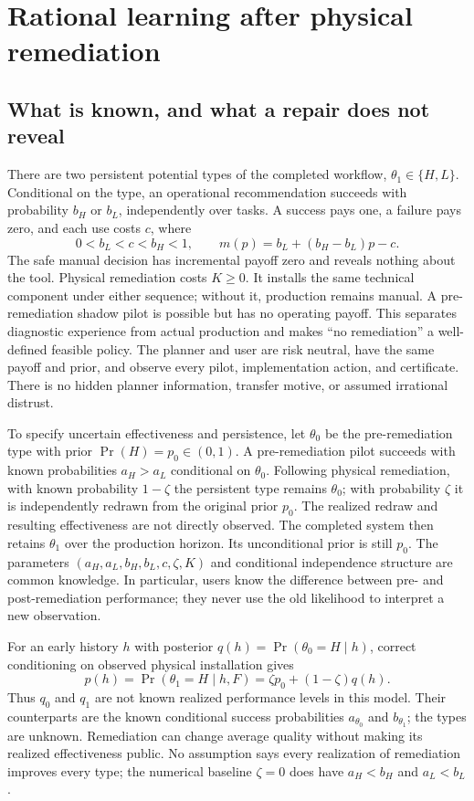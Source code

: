 \section{Rational learning after physical remediation}\label{sec:rational}
\subsection{What is known, and what a repair does not reveal}
There are two persistent potential types of the completed workflow, $\theta_1\in\{H,L\}$. Conditional on the type, an operational recommendation succeeds with probability $b_H$ or $b_L$, independently over tasks. A success pays one, a failure pays zero, and each use costs $c$, where
\[
 0<b_L<c<b_H<1,\qquad m(p)=b_L+(b_H-b_L)p-c.
\]
The safe manual decision has incremental payoff zero and reveals nothing about the tool. Physical remediation costs $K\geq0$. It installs the same technical component under either sequence; without it, production remains manual. A pre-remediation shadow pilot is possible but has no operating payoff. This separates diagnostic experience from actual production and makes ``no remediation'' a well-defined feasible policy. The planner and user are risk neutral, have the same payoff and prior, and observe every pilot, implementation action, and certificate. There is no hidden planner information, transfer motive, or assumed irrational distrust.

To specify uncertain effectiveness and persistence, let $\theta_0$ be the pre-remediation type with prior $\Pr(H)=p_0\in(0,1)$. A pre-remediation pilot succeeds with known probabilities $a_H>a_L$ conditional on $\theta_0$. Following physical remediation, with known probability $1-\zeta$ the persistent type remains $\theta_0$; with probability $\zeta$ it is independently redrawn from the original prior $p_0$. The realized redraw and resulting effectiveness are not directly observed. The completed system then retains $\theta_1$ over the production horizon. Its unconditional prior is still $p_0$. The parameters $(a_H,a_L,b_H,b_L,c,\zeta,K)$ and conditional independence structure are common knowledge. In particular, users know the difference between pre- and post-remediation performance; they never use the old likelihood to interpret a new observation.

For an early history $h$ with posterior $q(h)=\Pr(\theta_0=H\mid h)$, correct conditioning on observed physical installation gives
\begin{equation}
 p(h)=\Pr(\theta_1=H\mid h,F)=\zeta p_0+(1-\zeta)q(h).\label{eq:reset}
\end{equation}
Thus $q_0$ and $q_1$ are not known realized performance levels in this model. Their counterparts are the known conditional success probabilities $a_{\theta_0}$ and $b_{\theta_1}$; the types are unknown. Remediation can change average quality without making its realized effectiveness public. No assumption says every realization of remediation improves every type; the numerical baseline $\zeta=0$ does have $a_H<b_H$ and $a_L<b_L$.

